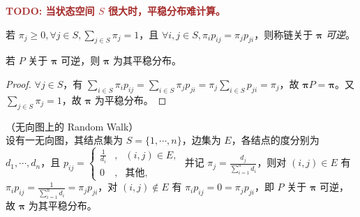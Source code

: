 \documentclass[../main.tex]{subfiles}
\begin{document}
\textbf{\textcolor{brown}{TODO: 当状态空间 $S$ 很大时，平稳分布难计算。}}

\begin{definition}\label{def:7.5.1}
    若 $\pi_j\geq0,\forall j\in S,\sum_{j\in S}\pi_j=1$，且 $\forall i,j\in S,\pi_ip_{ij}=\pi_jp_{ji}$，则称链关于 $\boldsymbol\pi$ \emph{可逆}。
\end{definition}

\begin{theorem}\label{thm:7.5.1}
    若 $P$ 关于 $\boldsymbol\pi$ 可逆，则 $\boldsymbol\pi$ 为其平稳分布。
\end{theorem}

\begin{proof}
    $\forall j\in S$，有 $\sum_{i\in S}\pi_ip_{ij}=\sum_{i\in S}\pi_jp_{ji}=\pi_j\sum_{i\in S}p_{ji}=\pi_j$，故 $\boldsymbol\pi P=\boldsymbol\pi$。又 $\sum_{j\in S}\pi_j=1$，故 $\boldsymbol\pi$ 为平稳分布。
\end{proof}

\begin{example}
    （无向图上的 Random Walk）\\
    设有一无向图，其结点集为 $S=\{1,\cdots,n\}$，边集为 $E$，各结点的度分别为 $d_1,\cdots,d_n$，且 $p_{ij}=
        \left\{\begin{aligned}
            \frac1{d_i} & , & (i,j)\in E,  \\
            0           & , & \text{其他},
        \end{aligned}\right.$ 并记 $\pi_j=\frac{d_j}{\sum_{i=1}^nd_i}$，则对 $(i,j)\in E$ 有 $\pi_ip_{ij}=\frac1{\sum_{i=1}^nd_i}=\pi_jp_{ji}$，对 $(i,j)\notin E$ 有 $\pi_ip_{ij}=0=\pi_jp_{ji}$，即 $P$ 关于 $\boldsymbol\pi$ 可逆，故 $\boldsymbol\pi$ 为其平稳分布。
\end{example}
\end{document}
